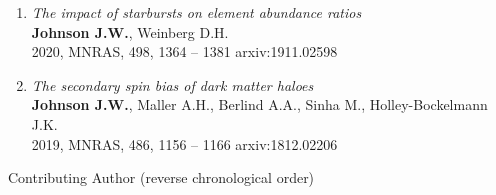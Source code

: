 \documentclass[cv.tex]{subfiles}
\begin{document}
\begin{enumerate}
	\item \textit{The impact of starbursts on element abundance ratios}
	\\
	\textbf{Johnson J.W.}, Weinberg D.H.
	\\
	2020, MNRAS, 498, 1364 -- 1381 \hfill arxiv:1911.02598

	\item \textit{The secondary spin bias of dark matter haloes}
	\\
	\textbf{Johnson J.W.}, Maller A.H., Berlind A.A., Sinha M.,
	Holley-Bockelmann J.K.
	\\
	2019, MNRAS, 486, 1156 -- 1166 \hfill arxiv:1812.02206

\end{enumerate}

\par\noindent
{\color{themecolor} \large Contributing Author}
(reverse chronological order)
\par\noindent
\end{document}
